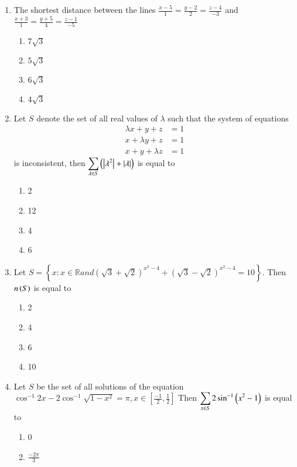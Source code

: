 \documentclass[journal]{IEEEtran}
\begin{document}
\begin{enumerate}
\begin{enumerate}
\end{enumerate}
\item The shortest distance between the lines $\frac{x-5}{1}=\frac{y-2}{2}=\frac{z-4}{-3}$ and $\frac{x+3}{1}=\frac{y+5}{4}=\frac{z-1}{-5}$
\begin{multicols}{2}
\begin{enumerate}
\item $7\sqrt{3}$
\item $5\sqrt{3}$
\item $6\sqrt{3}$
\item $4\sqrt{3}$
\end{enumerate}
\end{multicols}
\item Let $S$ denote the set of all real values of $\lambda$ such that the system of equations
\begin{align*}
    \lambda x+y+z&=1\\
    x+\lambda y+z&=1\\
    x+y+\lambda z&=1
\end{align*}
is inconsistent, then $\displaystyle \sum_{\lambda \in S}\left(\left\vert\lambda^2\right\vert + \left\vert\lambda\right\vert\right)$ is equal to 
\begin{enumerate}
\item 2
\item 12
\item 4
\item 6
\end{enumerate}
\item Let $S=\left\{ x:x \in \mathbb{R}  and  \left( \sqrt{3}+\sqrt{2}\right)^{x^2-4}+\left( \sqrt{3}-\sqrt{2}\right)^{x^2-4}=10\right\}.$ Then $n\left(S\right)$ is equal to 
\begin{multicols}{2}
\begin{enumerate}
\item 2
\item 4
\item 6
\item 10
\end{enumerate}
\end{multicols}
\item Let $S$ be the set of all solutions of the equation $\cos^{-1}{2x} -2 \cos^{-1}{\sqrt{1-x^2}}=\pi,  x \in \left[\frac{-1}{2},\frac{1}{2} \right] $ Then $\displaystyle \sum_{x\in S} 2 \sin^{-1}\left(x^2-1\right)$ is equal to
\begin{multicols}{2}
\begin{enumerate}
\item 0
\item $\frac{-2\pi}{3}$

\end{enumerate}
\end{multicols}
\end{enumerate}
\end{document}
